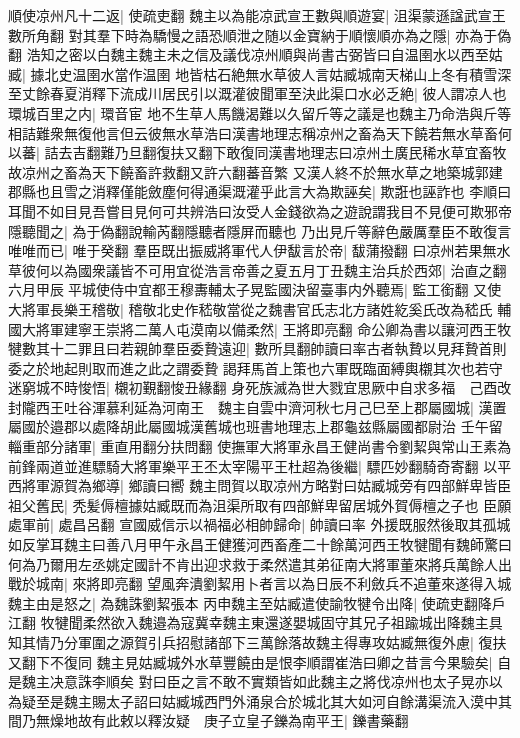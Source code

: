 順使凉州凡十二返|{
	使疏吏翻}
魏主以為能凉武宣王數與順遊宴|{
	沮渠蒙遜諡武宣王數所角翻}
對其羣下時為驕慢之語恐順泄之随以金寶納于順懷順亦為之隱|{
	亦為于偽翻}
浩知之密以白魏主魏主未之信及議伐凉州順與尚書古弼皆曰自温圉水以西至姑臧|{
	據北史温圉水當作温圉}
地皆枯石絶無水草彼人言姑臧城南天梯山上冬有積雪深至丈餘春夏消釋下流成川居民引以溉灌彼聞軍至決此渠口水必乏絶|{
	彼人謂凉人也}
環城百里之内|{
	環音宦}
地不生草人馬饑渴難以久留斤等之議是也魏主乃命浩與斤等相詰難衆無復他言但云彼無水草浩曰漢書地理志稱凉州之畜為天下饒若無水草畜何以蕃|{
	詰去吉翻難乃旦翻復扶又翻下敢復同漢書地理志曰凉州土廣民稀水草宜畜牧故凉州之畜為天下饒畜許救翻又許六翻蕃音繁}
又漢人終不於無水草之地築城郭建郡縣也且雪之消釋僅能斂塵何得通渠溉灌乎此言大為欺誣矣|{
	欺誑也誣詐也}
李順曰耳聞不如目見吾嘗目見何可共辨浩曰汝受人金錢欲為之遊說謂我目不見便可欺邪帝隱聽聞之|{
	為于偽翻說輸芮翻隱聽者隱屏而聽也}
乃出見斤等辭色嚴厲羣臣不敢復言唯唯而已|{
	唯于癸翻}
羣臣既出振威將軍代人伊馛言於帝|{
	馛蒲撥翻}
曰凉州若果無水草彼何以為國衆議皆不可用宜從浩言帝善之夏五月丁丑魏主治兵於西郊|{
	治直之翻}
六月甲辰平城使侍中宜都王穆夀輔太子晃監國決留臺事内外聽焉|{
	監工銜翻}
又使大將軍長樂王稽敬|{
	稽敬北史作嵇敬當從之魏書官氏志北方諸姓紇奚氏改為嵇氏}
輔國大將軍建寧王崇將二萬人屯漠南以備柔然|{
	王將即亮翻}
命公卿為書以讓河西王牧犍數其十二罪且曰若親帥羣臣委贄遠迎|{
	數所具翻帥讀曰率古者執贄以見拜贄首則委之於地起則取而進之此之謂委贄}
謁拜馬首上策也六軍既臨面縛輿櫬其次也若守迷窮城不時悛悟|{
	櫬初覲翻悛丑緣翻}
身死族滅為世大戮宜思厥中自求多福　己酉改封隴西王吐谷渾慕利延為河南王　魏主自雲中濟河秋七月己巳至上郡屬國城|{
	漢置屬國於邉郡以處降胡此屬國城漢舊城也班書地理志上郡龜兹縣屬國都尉治}
壬午留輜重部分諸軍|{
	重直用翻分扶問翻}
使撫軍大將軍永昌王健尚書令劉絜與常山王素為前鋒兩道並進驃騎大將軍樂平王丕太宰陽平王杜超為後繼|{
	驃匹妙翻騎奇寄翻}
以平西將軍源賀為鄉導|{
	鄉讀曰嚮}
魏主問賀以取凉州方略對曰姑臧城旁有四部鮮卑皆臣祖父舊民|{
	秃髪傉檀據姑臧既而為沮渠所取有四部鮮卑留居城外賀傉檀之子也}
臣願處軍前|{
	處昌呂翻}
宣國威信示以禍福必相帥歸命|{
	帥讀曰率}
外援既服然後取其孤城如反掌耳魏主曰善八月甲午永昌王健獲河西畜產二十餘萬河西王牧犍聞有魏師驚曰何為乃爾用左丞姚定國計不肯出迎求救于柔然遣其弟征南大將軍董來將兵萬餘人出戰於城南|{
	來將即亮翻}
望風奔潰劉絜用卜者言以為日辰不利斂兵不追董來遂得入城魏主由是怒之|{
	為魏誅劉絜張本}
丙申魏主至姑臧遣使諭牧犍令出降|{
	使疏吏翻降戶江翻}
牧犍聞柔然欲入魏邉為寇冀幸魏主東還遂嬰城固守其兄子祖踰城出降魏主具知其情乃分軍圍之源賀引兵招慰諸部下三萬餘落故魏主得專攻姑臧無復外慮|{
	復扶又翻下不復同}
魏主見姑臧城外水草豐饒由是恨李順謂崔浩曰卿之昔言今果驗矣|{
	自是魏主决意誅李順矣}
對曰臣之言不敢不實類皆如此魏主之將伐凉州也太子晃亦以為疑至是魏主賜太子詔曰姑臧城西門外涌泉合於城北其大如河自餘溝渠流入漠中其間乃無燥地故有此敕以釋汝疑　庚子立皇子鑠為南平王|{
	鑠書藥翻}
